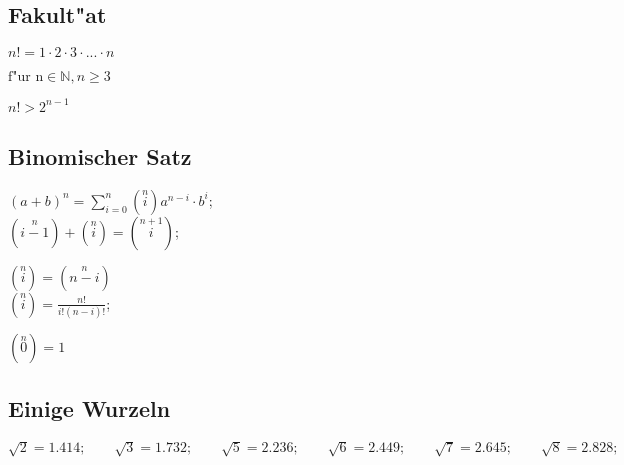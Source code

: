 \subsection{Fakult"at}
	\begin{minipage}[c]{6cm}
		$n! = 1\cdot2\cdot3\cdot...\cdot n $
	\end{minipage}
	\begin{minipage}[c]{6cm}
		$\text{f"ur n} \in \mathbb{N}, n \geq 3$
	\end{minipage}
	\begin{minipage}[c]{6cm}
		$n!>2^{n-1}$
	\end{minipage}
	
\subsection{Binomischer Satz}
	\begin{minipage}[c]{6cm}
		$\left(a+b\right)^n = \sum\limits _{i=0}^n \left(\stackrel{n}{i}\right)a^{n-i}\cdot b^i$;\\
		$\left(\stackrel{n}{i-1}\right)+\left(\stackrel{n}{i}\right)=\left(\stackrel{n+1}{i}\right)$;
	\end{minipage}
	\begin{minipage}[c]{6cm}
		$\left(\stackrel{n}{i}\right)=\left(\stackrel{n}{n-i}\right)$\\
		$\left(\stackrel{n}{i}\right)=\frac{n!}{i!\left(n-i\right)!}$;
	\end{minipage}
	\begin{minipage}[c]{6cm}	
		$\left(\stackrel{n}{0}\right)=1$
	\end{minipage}
	
\subsection{Einige Wurzeln}
$\sqrt{2} = 1.414; \qquad \sqrt{3} = 1.732; \qquad \sqrt{5} = 2.236; \qquad \sqrt{6} = 2.449; \qquad \sqrt{7} = 2.645; \qquad \sqrt{8} = 2.828;$
